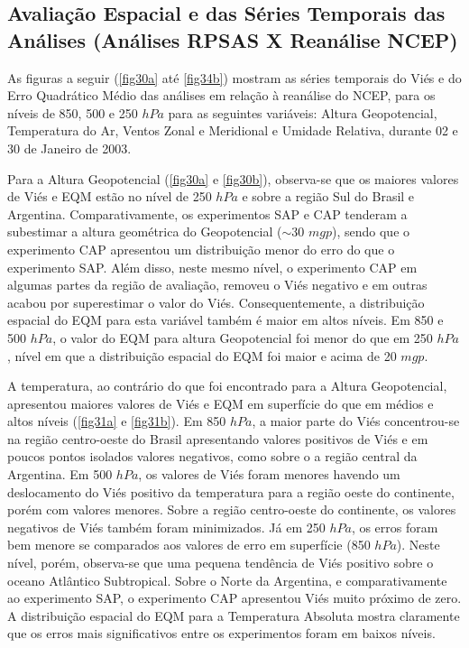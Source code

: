 \subsection{Avaliação Espacial e das Séries Temporais das Análises (Análises RPSAS X Reanálise NCEP)}
\label{ss:avalesanl}

As figuras a seguir (\autoref{fig30a} até \autoref{fig34b}) mostram as séries temporais do Viés e do Erro Quadrático Médio das análises em relação à reanálise do NCEP, para os níveis de 850, 500 e 250 $hPa$ para as seguintes variáveis: Altura Geopotencial, Temperatura do Ar, Ventos Zonal e Meridional e Umidade Relativa, durante 02 e 30 de Janeiro de 2003.

Para a Altura Geopotencial (\autoref{fig30a} e \autoref{fig30b}), observa-se que os maiores valores de Viés e EQM estão no nível de 250 $hPa$ e sobre a região Sul do Brasil e Argentina. Comparativamente, os experimentos SAP e CAP tenderam a subestimar a altura geométrica do Geopotencial ($\sim$30 $mgp$), sendo que o experimento CAP apresentou um distribuição menor do erro do que o experimento SAP. Além disso, neste mesmo nível, o experimento CAP em algumas partes da região de avaliação, removeu o Viés negativo e em outras acabou por superestimar o valor do Viés. Consequentemente, a distribuição espacial do EQM para esta variável também é maior em altos níveis. Em 850 e 500 $hPa$, o valor do EQM para altura Geopotencial foi menor do que em 250 $hPa$, nível em que a distribuição espacial do EQM foi maior e acima de 20 $mgp$.

A temperatura, ao contrário do que foi encontrado para a Altura Geopotencial, apresentou maiores valores de Viés e EQM em superfície do que em médios e altos níveis (\autoref{fig31a} e \autoref{fig31b}). Em 850 $hPa$, a maior parte do Viés concentrou-se na região centro-oeste do Brasil apresentando valores positivos de Viés e em poucos pontos isolados valores negativos, como sobre o a região central da Argentina. Em 500 $hPa$, os valores de Viés foram menores havendo um deslocamento do Viés positivo da temperatura para a região oeste do continente, porém com valores menores. Sobre a região centro-oeste do continente, os valores negativos de Viés também foram minimizados. Já em 250 $hPa$, os erros foram bem menore se comparados aos valores de erro em superfície (850 $hPa$). Neste nível, porém, observa-se que uma pequena tendência de Viés positivo sobre o oceano Atlântico Subtropical. Sobre o Norte da Argentina, e comparativamente ao experimento SAP, o experimento CAP apresentou Viés muito próximo de zero. A distribuição espacial do EQM para a Temperatura Absoluta mostra claramente que os erros mais significativos entre os experimentos foram em baixos níveis.

